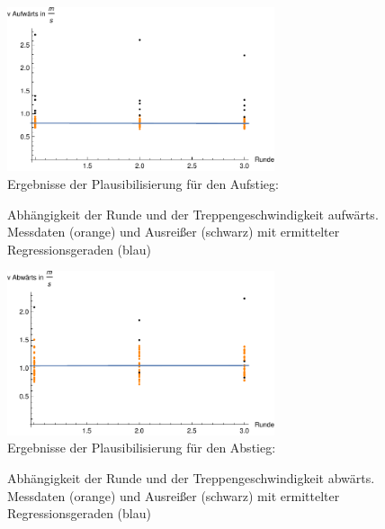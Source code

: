 \begin{figure}[htpb]
\centering
\includegraphics[width=0.7\textwidth]{abbildungen/regression/2012_2017_verbund/ohneausreisser/auf-runde.pdf}
\justify \ \\
Ergebnisse der Plausibilisierung für den Aufstieg:

\caption{Abhängigkeit der Runde und der Treppengeschwindigkeit aufwärts. Messdaten (orange) und Ausreißer (schwarz) mit ermittelter Regressionsgeraden (blau)}
\label{fig:2012_und_2017_MA_auf_runde}
\end{figure}



\begin{figure}[htpb]
\centering
\includegraphics[width=0.7\textwidth]{abbildungen/regression/2012_2017_verbund/ohneausreisser/ab-runde.pdf}
\justify \ \\
Ergebnisse der Plausibilisierung für den Abstieg:

\caption{Abhängigkeit der Runde und der Treppengeschwindigkeit abwärts. Messdaten (orange) und Ausreißer (schwarz) mit ermittelter Regressionsgeraden (blau)}
\label{fig:2012_und_2017_MA_ab_runde}
\end{figure}



